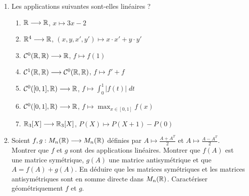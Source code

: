 \begin{frame}

\begin{miniexercice}

\begin{enumerate}

  \item Les applications suivantes sont-elles linéaires ?

  \begin{enumerate}
    \item $\mathbb{R} \longrightarrow \mathbb{R}$, \quad $x \longmapsto 3x-2$
    \item $\mathbb{R}^4 \longrightarrow \mathbb{R}$, \quad $(x,y,x',y') \longmapsto x\cdot x' + y \cdot y'$
    \item $\mathcal{C}^0(\mathbb{R},\mathbb{R}) \longrightarrow \mathbb{R}$, \quad $f \longmapsto f(1)$
    \item $\mathcal{C}^1(\mathbb{R},\mathbb{R}) \longrightarrow \mathcal{C}^0(\mathbb{R},\mathbb{R})$, \quad $f \longmapsto f'+f$
    \item $\mathcal{C}^0([0,1],\mathbb{R}) \longrightarrow \mathbb{R}$, \quad $f \longmapsto \int_0^1 |f(t)|\; dt$
    \item $\mathcal{C}^0([0,1],\mathbb{R}) \longrightarrow \mathbb{R}$, \quad $f \longmapsto \max_{x\in [0,1]} f(x)$
    \item $\mathbb{R}_3[X] \longrightarrow \mathbb{R}_3[X]$, \quad $P(X) \longmapsto P(X+1) - P(0)$
  \end{enumerate}
  
  \item Soient $f,g : M_n(\mathbb{R}) \longrightarrow M_n(\mathbb{R})$ 
  définies par $A \longmapsto \frac{A+A^T}{2}$ et $A \longmapsto \frac{A-A^T}{2}$. 
  Montrer que $f$ et $g$ sont des applications linéaires.
  Montrer que $f(A)$ est une matrice symétrique, $g(A)$ une matrice antisymétrique
  et que $A = f(A)+g(A)$. En déduire que les matrices symétriques et les matrices antisymétriques sont en somme
  directe dans $M_n(\mathbb{R})$. Caractériser géométriquement $f$ et $g$.
\end{enumerate}
\end{miniexercice}

\end{frame}

